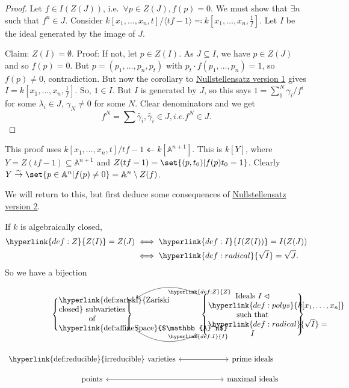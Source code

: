 \documentclass{article}
\newcommand{\A}{\mathbb{A}}
\begin{document}
\color{gray}
\begin{proof}
    Let $f \in I(Z(J))$, i.e.\ $\forall p \in Z(J), f(p) = 0$.
    We must show that $\exists n$ such that $f^n \in J$.
    Consider $k[x_1, \dotsc, x_n, t]/\langle tf-1 \rangle \eqqcolon k[x_1, \dotsc, x_n, \frac{1}{f}]$.
    Let $I$ be the ideal generated by the image of $J$.

    Claim: $Z(I) = \emptyset$. Proof: If not, let $p \in Z(I)$. As $J \subseteq I$, we have $p \in Z(J)$ and so $f(p) = 0$. But $p=(p_1, \dotsc, p_n, p_t)$ with $p_t \cdot f(p_1, \dotsc, p_n) = 1$, so $f(p) \neq 0$, contradiction.
    But now the corollary to \hyperlink{def:null1}{Nullstellensatz version 1} gives $I=k[x_1, \dotsc, x_n, \frac{1}{f}]$. So, $1 \in I$. But $I$ is generated by $J$, so this says $1 = \sum_1^N \gamma_i/f^i$ for some $\lambda_i \in J$, $\gamma_N \neq 0$ for some $N$.
    Clear denominators and we get
    \begin{equation*}
        f^N = \sum \tilde{\gamma_i}, \tilde{\gamma_i} \in J, i.e. f^N \in J.
    \end{equation*}
\end{proof}
\begin{remark}
    This proof uses $k[x_1, \dotsc, x_n, t]/tf-1 \twoheadleftarrow k[\A^{n+1}]$. This is $k[Y]$, where $Y = Z(tf-1) \subseteq \A^{n+1}$ and $Z(tf-1) = \set{(p, t_0) | f(p) t_0 = 1}$.
    Clearly $Y \overset{\sim}{\rightarrow} \set{p \in \A^n | f(p) \neq 0} = \A^n \setminus Z(f)$.
\end{remark}
\color{black}
We will return to this, but first deduce some consequences of \hyperlink{def:null2}{Nullstellensatz version 2}.
\begin{cor}
    If $k$ is algebraically closed,
    \begin{align*}\hyperlink{def:Z}{Z(I)} = Z(J) &\iff \hyperlink{def:I}{I(Z(I))} = I(Z(J))\\ &\iff \hyperlink{def:radical}{\sqrt{I}} = \sqrt{J}.\end{align*}
    So we have a bijection
    \begin{equation*}
        \begin{tikzcd}[row sep=small]
            \left\{\parbox{3cm}{\centering \hyperlink{def:zariski}{Zariski closed} subvarieties of \hyperlink{def:affineSpace}{$\A^n$}}\right\}
            \ar[r, bend right, hookrightarrow, "\hyperlink{def:I}{I}", start anchor=-20, end anchor=200]&
            \left\{\parbox{4cm}{\centering Ideals $I \lhd \hyperlink{def:polys}{k[x_1, \dotsc, x_n]}$ such that $\hyperlink{def:radical}{\sqrt{I}}=I$}\right\}
            \ar[l, bend right, two heads, "\hyperlink{def:Z}{Z}", start anchor=160, end anchor=20] \\ \\
            \text{\hyperlink{def:reducible}{irreducible} varieties} \ar[r, leftrightarrow] & \text{prime ideals} \\
            \text{points} \rar[leftrightarrow] & \text{maximal ideals} \\
        \end{tikzcd}
    \end{equation*}
\end{cor}
\end{document}
